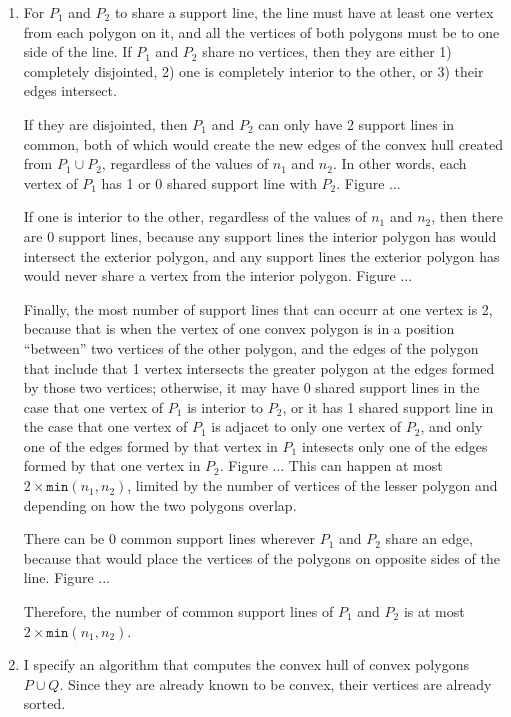 \documentclass [12pt]{article}
\begin{document}
    \begin{enumerate}[label=(\alph*)]
        \item For $P_1$ and $P_2$ to share a support line, the line must have at least one vertex from each polygon on it, and all the vertices of both polygons must be to one side of the line. If $P_1$ and $P_2$ share no vertices, then they are either 1) completely disjointed, 2) one is completely interior to the other, or 3) their edges intersect. 
        
        If they are disjointed, then $P_1$ and $P_2$ can only have 2 support lines in common, both of which would create the new edges of the convex hull created from $P_1 \cup P_2$, regardless of the values of $n_1$ and $n_2$. In other words, each vertex of $P_1$ has 1 or 0 shared support line with $P_2$. Figure ...
        
        If one is interior to the other, regardless of the values of $n_1$ and $n_2$, then there are 0 support lines, because any support lines the interior polygon has would intersect the exterior polygon, and any support lines the exterior polygon has would never share a vertex from the interior polygon. Figure ...
        
        Finally, the most number of support lines that can occurr at one vertex is 2, because that is when the vertex of one convex polygon is in a position ``between'' two vertices of the other polygon, and the edges of the polygon that include that 1 vertex intersects the greater polygon at the edges formed by those two vertices; otherwise, it may have 0 shared support lines in the case that one vertex of $P_1$ is interior to $P_2$, or it has 1 shared support line in the case that one vertex of $P_1$ is adjacet to only one vertex of $P_2$, and only one of the edges formed by that vertex in $P_1$ intesects only one of the edges formed by that one vertex in $P_2$. Figure ... This can happen at most $2 \times \texttt{min}(n_1, n_2)$, limited by the number of vertices of the lesser polygon and depending on how the two polygons overlap.

        There can be 0 common support lines wherever $P_1$ and $P_2$ share an edge, because that would place the vertices of the polygons on opposite sides of the line. Figure ...
        
        Therefore, the number of common support lines of $P_1$ and $P_2$ is at most $2 \times \texttt{min}(n_1, n_2)$.
 
        \pagebreak
        \item I specify an algorithm that computes the convex hull of convex polygons $P \cup Q$. Since they are already known to be convex, their vertices are already sorted.
        


\end{enumerate}
\end{document}
